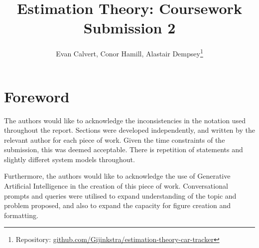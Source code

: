 \documentclass[12pt,a4paper]{article}
\title{Estimation Theory: Coursework Submission 2}
\author{Evan Calvert, Conor Hamill, Alastair Dempsey\thanks{
Repository: \href{https://github.com/Gijinkstra/estimation-theory-car-tracker}
{github.com/Gijinkstra/estimation-theory-car-tracker}
}
}
\begin{document}
\maketitle
\tableofcontents

\section*{Foreword}
The authors would like to acknowledge the inconsistencies in the notation used throughout the report. Sections were developed independently, and written by the relevant author for each piece of work. Given the time constraints of the submission, this was deemed acceptable.
There is repetition of statements and slightly differet system models throughout.

Furthermore, the authors would like to acknowledge the use of Generative Artificial Intelligence in the creation of this piece of work. Conversational prompts and queries were utilised to expand understanding of the topic and problem proposed, and also to expand the capacity for figure creation and formatting.




















\end{document}
